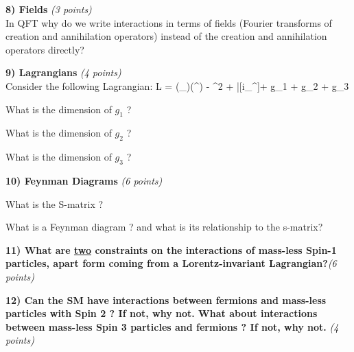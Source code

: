 {\textbf{8) Fields } \hfill \textit{(3 points)}\\
In QFT why do we write interactions in terms of fields (Fourier transforms of creation and annihilation operators)  instead  of the creation and annihilation operators directly?

\vspace*{2in}

\textbf{9) Lagrangians } \hfill \textit{(4 points)}\\
Consider the following Lagrangian:
\be
L =  (\partial_\mu\phi)(\partial^\mu\phi) - \phi^2 + \bar{\psi}[i\gamma_\mu\partial^\mu]\psi + g_1 \phi \psi \psi + g_2 \psi \psi \psi \psi + g_3 \phi \phi \phi \phi
\ee

\bi
\item[a)] What is the dimension of $g_1$ ? 
\vspace*{1in}
\item[b)] What is the dimension of $g_2$ ? 
\vspace*{1in}
\item[c)] What is the dimension of $g_3$ ? 
\vspace*{1in}
\ei

\clearpage

\textbf{10) Feynman Diagrams }\hfill \textit{(6 points)}\\
\bi
\item[a)]What is the S-matrix ?
\vspace*{1in}
\item[b)]What is a Feynman diagram ? and what is its relationship to the s-matrix?
\vspace*{1in}
\ei


\textbf{11) What are \underline{two} constraints on the interactions of mass-less Spin-1 particles, apart form coming from a Lorentz-invariant Lagrangian?}\hfill \textit{(6 points)}\\

\vspace*{2in}

\textbf{12) Can the SM have interactions between fermions and mass-less particles with Spin 2 ? If not, why not.  What about interactions between mass-less Spin 3 particles and fermions ? If not, why not. }\hfill \textit{(4 points)}\\

}
